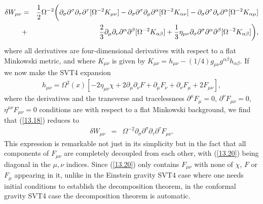 %
\begin{eqnarray}
\delta W_{\mu\nu}&=&\frac{1}{2}\Omega^{-2}\bigg{(}\partial_{\sigma}\partial^{\sigma}\partial_{\tau}\partial^{\tau}[\Omega^{-2}K_{\mu\nu}]
-\partial_{\sigma}\partial^{\sigma}\partial_{\mu}\partial^{\alpha}[\Omega^{-2}K_{\alpha\nu}]
-\partial_{\sigma}\partial^{\sigma}\partial_{\nu}\partial^{\alpha}[\Omega^{-2}K_{\alpha\mu}]
\nonumber\\
&+&\frac{2}{3}\partial_{\mu}\partial_{\nu}\partial^{\alpha}\partial^{\beta}[\Omega^{-2}K_{\alpha\beta}]+\frac{1}{3}\eta_{\mu\nu}\partial_{\sigma}\partial^{\sigma}\partial^{\alpha}\partial^{\beta}[\Omega^{-2}K_{\alpha\beta}]\bigg{)},
\label{13.18}
\end{eqnarray} 
%
where all derivatives are four-dimensional derivatives with respect to a flat Minkowski metric, and where $K_{\mu\nu}$ is given by $K_{\mu\nu}=h_{\mu\nu}-(1/4)g_{\mu\nu}g^{\alpha\beta}h_{\alpha\beta}$. If we now make the SVT4 expansion
%
\begin{eqnarray}
h_{\mu\nu}=\Omega^2(x)\left[-2\eta_{\mu\nu}\chi+2\partial_{\mu}\partial_{\nu}F
+ \partial_{\mu}F_{\nu}+\partial_{\nu}F_{\mu}+2F_{\mu\nu}\right],
\label{13.19}
\end{eqnarray}
%
where the derivatives and the transverse and tracelessness  $\partial^{\mu}F_{\mu}=0$, $\partial^{\nu}F_{\mu\nu}=0$, $\eta^{\mu\nu}F_{\mu\nu}=0$ conditions are with respect to a flat Minkowski background, we find that (\ref{13.18}) reduces to
%
\begin{eqnarray}
\delta W_{\mu\nu}&=&\Omega^{-2}\partial_{\sigma}\partial^{\sigma}\partial_{\tau}\partial^{\tau}F_{\mu\nu}.
\label{13.20}
\end{eqnarray} 
%
This expression is remarkable not just in its simplicity but in the fact that all components of $F_{\mu\nu}$ are completely decoupled from each other, with (\ref{13.20}) being diagonal in the $\mu,\nu$ indices. Since (\ref{13.20}) only contains $F_{\mu\nu}$ with none of $\chi$, $F$ or $F_{\mu}$ appearing  in it, unlike in the Einstein gravity SVT4 case where one needs initial conditions to establish the decomposition theorem, in the conformal gravity SVT4 case the decomposition theorem is automatic.

